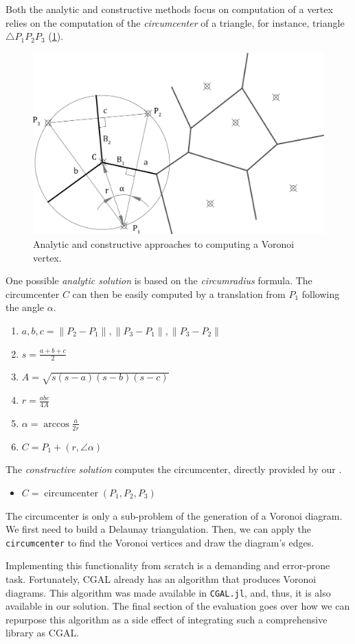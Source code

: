 Both the analytic and constructive methods focus on computation of a vertex
relies on the computation of the \textit{circumcenter} of a triangle, for
instance, triangle $\triangle P_1 P_2 P_3$
(\cref{fig:eval.studies.voronoi.sol}).

\begin{figure}[htb]
  \centering
  \includegraphics[width=.7\linewidth]{fig/voronoi-solution}
  \caption{\label{fig:eval.studies.voronoi.sol}
    Analytic and constructive approaches to computing a Voronoi vertex.}%
\end{figure}

One possible \textit{analytic solution} is based on the \textit{circumradius}
formula.  The circumcenter $C$ can then be easily computed by a translation from
$P_1$ following the angle $\alpha$.

\begin{enumerate}
  \item $a, b, c = \lVert P_2 - P_1 \rVert, \lVert P_3 - P_1 \rVert, \lVert P_3
  - P_2 \rVert$
  \item $s = \frac{a + b + c}{2}$
  \item $A = \sqrt{s(s - a)(s - b)(s - c)}$
  \item $r = \frac{abc}{4A}$
  \item $\alpha = \arccos\frac{a}{2r}$
  \item $C = P_1 + \left(r, \angle\alpha\right)$
\end{enumerate}

The \textit{constructive solution} computes the circumcenter, directly provided
by our \primitives{}.

\begin{itemize}
  \item[] $C = \operatorname{circumcenter}\left(P_1, P_2, P_3\right)$
\end{itemize}

The circumcenter is only a sub-problem of the generation of a Voronoi diagram.
We first need to build a Delaunay triangulation.  Then, we can apply the
\texttt{circumcenter} to find the Voronoi vertices and draw the diagram's edges.

Implementing this functionality from scratch is a demanding and error-prone
task.  Fortunately, \ac{CGAL} already has an algorithm that produces Voronoi
diagrams.  This algorithm was made available in \texttt{CGAL.jl},
and, thus, it is also available in our solution.  The final section of the
evaluation goes over how we can repurpose this algorithm as a side effect of
integrating such a comprehensive library as \ac{CGAL}.
